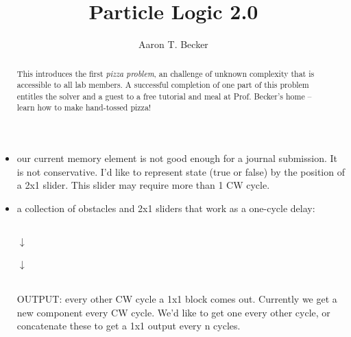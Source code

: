 \documentclass[letterpaper, 10 pt, conference]{ieeeconf}
\begin{document}
\author{Aaron T. Becker}
\title{Particle Logic 2.0}
\maketitle

\begin{abstract}
This introduces the first \emph{pizza problem}, an challenge of unknown complexity that is accessible to all lab members.  A successful completion of one part of this problem entitles the solver and a guest to a free tutorial and meal at Prof. Becker's home -- learn how to make hand-tossed pizza!  
\end{abstract}


\begin{itemize}
\item our current memory element is not good enough for a journal submission. It is not conservative.  I'd like to represent state (true or false) by the position of a 2x1 slider.  This slider may require more than 1 CW cycle.

\item a collection of obstacles and 2x1 sliders that work as a one-cycle delay:\\

\begin{centering}
 \\
$\downarrow$\\ 
\\
$\downarrow$\\ 
   \\
\end{centering}
   
OUTPUT:  every other CW cycle a 1x1 block comes out.  Currently we get a new component every CW cycle.  We'd like to get one every other cycle, or concatenate these to get a 1x1 output every n cycles.


\end{itemize}
\end{document}
